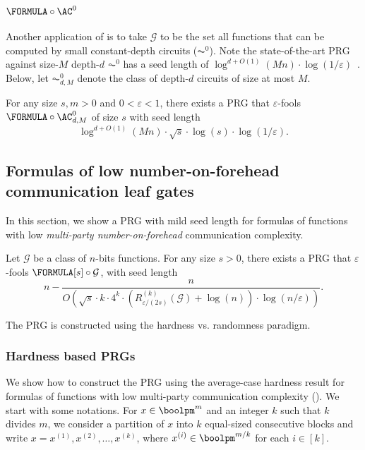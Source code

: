 %
%
%
%
%
%
%
%
%
%
    \subsubsection{\texorpdfstring{$\FORMULA\circ\AC^0$}{FORMULA-AC0}}

	Another application of  is to take $\mathcal{G}$ to be the set all functions that can be computed by small constant-depth circuits ($\AC^0$). Note the state-of-the-art PRG against size-$M$ depth-$d$ $\AC^0$ has a seed length of $\log^{d+O(1)}(Mn)\cdot\log(1/\varepsilon)$~\cite{ST19}. Below, let $\AC^0_{d,M}$ denote the class of depth-$d$ circuits of size at most $M$.
	
	\setcounter{theorem}{34}
\begin{theorem}\label{thm:prg-formula-ac0}
		For any size $s,m>0$ and $0<\varepsilon<1$, there exists a PRG that $\varepsilon$-fools $\FORMULA\circ \AC^0_{d,M}$ of size $s$ with seed length
		\[
			\log^{d+O(1)}(Mn)\cdot\sqrt{s}\cdot\log(s)\cdot\log(1/\varepsilon).
		\]
	\end{theorem}
	
%
%
%
%
%
%
%
%
%
	\subsection{Formulas of low number-on-forehead communication leaf gates}
	
	In this section, we show a PRG with mild seed length for formulas of functions with low \emph{multi-party number-on-forehead} communication complexity.
	
	\setcounter{theorem}{36}
\begin{theorem}\label{thm:mild-prg}
	    Let $\mathcal{G}$ be a class of $n$-bits functions. For any size $s>0$, there exists a PRG that $\varepsilon$-fools $\FORMULA[s]\circ \mathcal{G}$, with seed length
		\[
		    n-\frac{n}{O\left(\sqrt{s}\cdot k\cdot4^k\cdot \left( R^{(k)}_{\varepsilon/(2s)}(\mathcal{G})+\log(n)\right)\cdot\log(n/\varepsilon)\right)}.
		\]
	\end{theorem}
	
	The PRG is constructed using the hardness vs. randomness paradigm.
	    
	\subsubsection{Hardness based PRGs}
	
	We show how to construct the PRG using the average-case hardness result for formulas of functions with low multi-party communication complexity (). We start with some notations. For $x\in\boolpm^m$ and an integer $k$ such that $k$ divides $m$, we consider a partition of $x$ into $k$ equal-sized consecutive blocks and write $x=x^{(1)},x^{(2)},\dots,x^{(k)}$, where $x^{(i)}\in\boolpm^{m/k}$ for each $i\in [k]$.
    	
